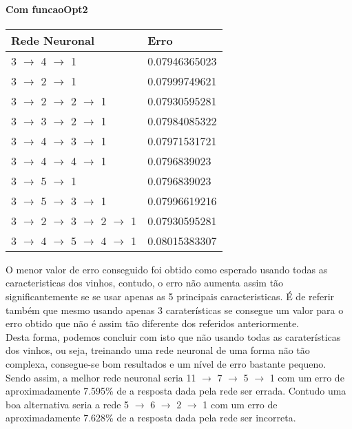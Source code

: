 \documentclass{article}
\begin{document}
\paragraph{Com funcaoOpt2}
\begin{center}
\begin{tabular}{ | l | l | }
\hline
Rede Neuronal & Erro\\ \hline
3 $\to$ 4 $\to$ 1 & 0.07946365023\\ \hline
3 $\to$ 2 $\to$ 1 & 0.07999749621\\ \hline
3 $\to$ 2 $\to$ 2 $\to$ 1 & 0.07930595281\\ \hline
3 $\to$ 3 $\to$ 2 $\to$ 1 & 0.07984085322\\ \hline
3 $\to$ 4 $\to$ 3 $\to$ 1 & 0.07971531721\\ \hline
3 $\to$ 4 $\to$ 4 $\to$ 1 & 0.0796839023\\ \hline
3 $\to$ 5 $\to$ 1 & 0.0796839023\\ \hline
3 $\to$ 5 $\to$ 3 $\to$ 1 & 0.07996619216\\ \hline
3 $\to$ 2 $\to$ 3 $\to$ 2 $\to$ 1 & 0.07930595281\\ \hline
3 $\to$ 4 $\to$ 5 $\to$ 4 $\to$ 1 & 0.08015383307\\ \hline
\end{tabular}
\end{center}

O menor valor de erro conseguido foi obtido como esperado usando todas as caracteristicas dos vinhos, contudo, o erro não aumenta assim tão significantemente se se usar apenas as 5 principais caracteristicas. É de referir também que mesmo usando apenas 3 caraterísticas se consegue um valor para o erro obtido que não é assim tão diferente dos referidos anteriormente.\\
Desta forma, podemos concluir com isto que não usando todas as caraterísticas dos vinhos, ou seja, treinando uma rede neuronal de uma forma não tão complexa, consegue-se bom resultados e um nível de erro bastante pequeno.
Sendo assim, a melhor rede neuronal seria 11 $\to$ 7 $\to$ 5 $\to$ 1 com um erro de aproximadamente 7.595\% de a resposta dada pela rede ser errada. Contudo uma boa alternativa seria a rede 5 $\to$ 6 $\to$ 2 $\to$ 1 com um erro de aproximadamente 7.628\% de a resposta dada pela rede ser incorreta.

\newpage

\vspace*{\fill}
\end{document}
